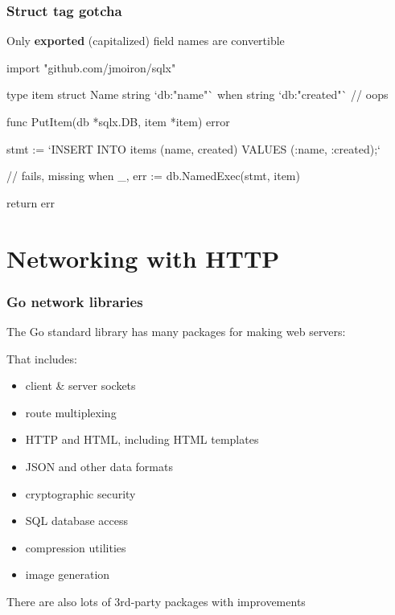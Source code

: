 \documentclass[handout,compress,t,11pt]{beamer}
\begin{document}
\begin{frame}[fragile]
    \frametitle{Struct tag gotcha}
    Only {\bf exported} (capitalized) field names are convertible
    \vspace{0.4\baselineskip}
\begin{golang}
import "github.com/jmoiron/sqlx"
    
type item struct {
	Name string `db:"name"`
	when string `db:"created"` // oops
}

func PutItem(db *sqlx.DB, item *item) error {
	stmt := `INSERT INTO items (name, created) 
             VALUES (:name, :created);`

    // fails, missing when
	_, err := db.NamedExec(stmt, item)

	return err
}
\end{golang}
\end{frame}


\section{Networking with HTTP}


\begin{frame}[fragile]
    \frametitle{Go network libraries}
    The Go standard library has many packages for making web servers: \par
    \vspace{\baselineskip}
    That includes:
    \begin{itemize}
        \item client \& server sockets
        \item route multiplexing
        \item HTTP and HTML, including HTML templates
        \item JSON and other data formats
        \item cryptographic security
        \item SQL database access
        \item compression utilities
        \item image generation
    \end{itemize}
    \vspace{0.4\baselineskip}
    There are also lots of 3rd-party packages with improvements \par
\end{frame}
\end{document}
